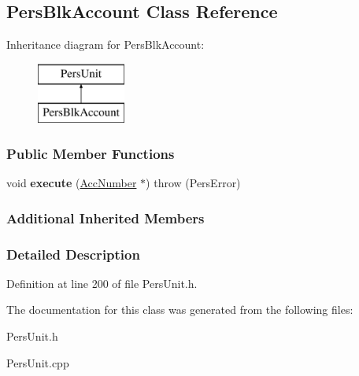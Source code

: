 \hypertarget{classPersBlkAccount}{\subsection{Pers\-Blk\-Account Class Reference}
\label{d6/d7d/classPersBlkAccount}
}
Inheritance diagram for Pers\-Blk\-Account\-:\begin{figure}[H]
\begin{center}
\leavevmode
\includegraphics[height=2.000000cm]{d6/d7d/classPersBlkAccount}
\end{center}
\end{figure}
\subsubsection*{Public Member Functions}
\begin{DoxyCompactItemize}
\item 
\hypertarget{classPersBlkAccount_ac194c547436f62695c246d1f32e7574c}{void {\bfseries execute} (\hyperlink{classAccNumber}{Acc\-Number} $\ast$)  throw (\-Pers\-Error)}\label{d6/d7d/classPersBlkAccount_ac194c547436f62695c246d1f32e7574c}

\end{DoxyCompactItemize}
\subsubsection*{Additional Inherited Members}


\subsubsection{Detailed Description}


Definition at line 200 of file Pers\-Unit.\-h.



The documentation for this class was generated from the following files\-:\begin{DoxyCompactItemize}
\item 
Pers\-Unit.\-h\item 
Pers\-Unit.\-cpp\end{DoxyCompactItemize}

